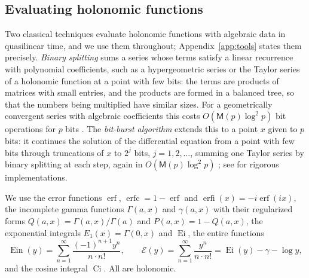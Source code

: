 \documentclass[11pt,reqno]{amsart}
\theoremstyle{definition}
\theoremstyle{remark}
\newcommand{\erfc}{\operatorname{erfc}}
\newcommand{\erfi}{\operatorname{erfi}}
\newcommand{\Ci}{\operatorname{Ci}}
\newcommand{\Ein}{\operatorname{Ein}}
\newcommand{\Eip}{\mathcal{E}}
\newcommand{\Mul}{\mathsf{M}}
\begin{document}
\subsection{Evaluating holonomic functions}\label{sec:evalhol}
Two classical techniques evaluate holonomic functions with algebraic data in quasilinear time, and we use them
throughout; Appendix~\ref{app:tools} states them precisely. \emph{Binary splitting} sums a series whose terms satisfy a
linear recurrence with polynomial coefficients, such as a hypergeometric series or the Taylor series of a holonomic
function at a point with few bits: the terms are products of matrices with small entries, and the products are formed
in a balanced tree, so that the numbers being multiplied have similar sizes. For a geometrically convergent series
with algebraic coefficients this costs $O(\Mul(p)\log^2p)$ bit operations for $p$ bits \cite{HP98,CC90,CHTZZ07}. The
\emph{bit-burst algorithm} extends this to a point $x$ given to $p$ bits: it continues the solution of the
differential equation from a point with few bits through truncations of $x$ to $2^j$ bits, $j = 1, 2, \dots$, summing
one Taylor series by binary splitting at each step, again in $O(\Mul(p)\log^2p)$ \cite{CC90,vdH99}; see
\cite{Mez10,Mez16} for rigorous implementations.

We use the error functions $\operatorname{erf}$, $\erfc = 1 - \operatorname{erf}$ and
$\erfi(x) = -i\operatorname{erf}(ix)$, the incomplete gamma functions $\Gamma(a,x)$ and $\gamma(a,x)$ with their
regularized forms $Q(a,x) = \Gamma(a,x)/\Gamma(a)$ and $P(a,x) = 1 - Q(a,x)$, the exponential integrals
$E_1(x) = \Gamma(0,x)$ and $\operatorname{Ei}$, the entire functions
\[
  \Ein(y) = \sum_{n=1}^{\infty}\frac{(-1)^{n+1}y^n}{n\cdot n!}, \qquad \Eip(y) = \sum_{n=1}^{\infty}\frac{y^n}{n\cdot n!}
  = \operatorname{Ei}(y) - \gamma - \log y,
\]
and the cosine integral $\Ci$. All are holonomic.
\end{document}
